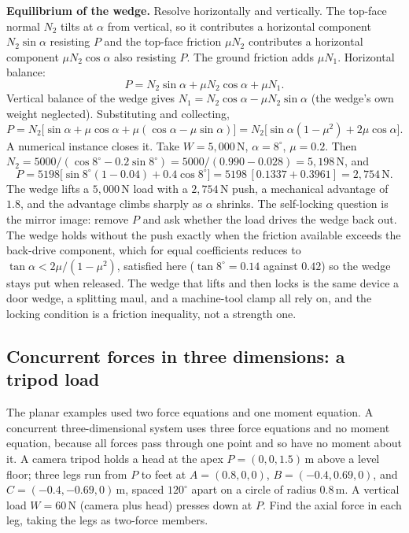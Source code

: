 \textbf{Equilibrium of the wedge.} Resolve horizontally and vertically. The
top-face normal $N_2$ tilts at $\alpha$ from vertical, so it contributes a
horizontal component $N_2\sin\alpha$ resisting $P$ and the top-face
friction $\mu N_2$ contributes a horizontal component $\mu N_2\cos\alpha$
also resisting $P$. The ground friction adds $\mu N_1$. Horizontal
balance:
\[
P = N_2\sin\alpha + \mu N_2\cos\alpha + \mu N_1.
\]
Vertical balance of the wedge gives $N_1 = N_2\cos\alpha - \mu N_2
\sin\alpha$ (the wedge's own weight neglected). Substituting and
collecting,
\[
P = N_2\big[\sin\alpha + \mu\cos\alpha + \mu(\cos\alpha -
\mu\sin\alpha)\big]
= N_2\big[\sin\alpha(1 - \mu^2) + 2\mu\cos\alpha\big].
\]
A numerical instance closes it. Take $W = 5{,}000\,\text{N}$, $\alpha =
8^{\circ}$, $\mu = 0.2$. Then $N_2 = 5000/(\cos 8^{\circ} - 0.2\sin
8^{\circ}) = 5000/(0.990 - 0.028) = 5{,}198\,\text{N}$, and
\[
P = 5198\big[\sin 8^{\circ}(1 - 0.04) + 0.4\cos 8^{\circ}\big]
= 5198\,[0.1337 + 0.3961] = 2{,}754\,\text{N}.
\]
The wedge lifts a $5{,}000\,\text{N}$ load with a $2{,}754\,\text{N}$
push, a mechanical advantage of $1.8$, and the advantage climbs sharply as
$\alpha$ shrinks. The self-locking question is the mirror image: remove
$P$ and ask whether the load drives the wedge back out. The wedge holds
without the push exactly when the friction available exceeds the back-drive
component, which for equal coefficients reduces to $\tan\alpha < 2\mu/(1 -
\mu^2)$, satisfied here ($\tan 8^{\circ} = 0.14$ against $0.42$) so the
wedge stays put when released. The wedge that lifts and then locks is the
same device a door wedge, a splitting maul, and a machine-tool clamp all
rely on, and the locking condition is a friction inequality, not a
strength one.

\subsection{Concurrent forces in three dimensions: a tripod load}

The planar examples used two force equations and one moment equation. A
concurrent three-dimensional system uses three force equations and no
moment equation, because all forces pass through one point and so have no
moment about it. A camera tripod holds a head at the apex $P =
(0, 0, 1.5)\,\si{\meter}$ above a level floor; three legs run from $P$ to
feet at $A = (0.8, 0, 0)$, $B = (-0.4, 0.69, 0)$, and $C = (-0.4, -0.69,
0)\,\si{\meter}$, spaced $120^{\circ}$ apart on a circle of radius
$0.8\,\si{\meter}$. A vertical load $W = 60\,\text{N}$ (camera plus head)
presses down at $P$. Find the axial force in each leg, taking the legs as
two-force members.

